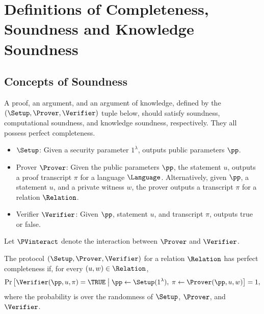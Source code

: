 \section{Definitions of Completeness, Soundness and Knowledge Soundness}
\label{appx:def}

\subsection{Concepts of Soundness}
\label{appx:soundness}
\begin{definition}
\label{def:proofArgumentAoK}
A proof, an argument, and an argument of knowledge,
defined by the $(\Setup, \Prover, \Verifier)$ tuple below,
should satisfy 
soundness,
computational soundness, and 
knowledge soundness,
respectively.
They all possess perfect completeness.
\begin{itemize}
	\item $\Setup$:
	Given a security parameter $1^\lambda$, outputs public parameters $\pp$.
	\item Prover $\Prover$:
	Given the public parameters $\pp$, the statement $u$, outputs a proof transcript $\pi$ for a language $\Language$.
	Alternatively, given $\pp$, a statement $u$, and a private witness $w$, the prover outputs a transcript $\pi$ for a relation $\Relation$.
	\item Verifier $\Verifier$:
	Given $\pp$, statement $u$, and transcript $\pi$, outputs {\sf true} or {\sf false}.
\end{itemize}
Let $\PVinteract$ denote the interaction between $\Prover$ and $\Verifier$.
\end{definition}

\begin{definition}
	\label{def:perfect-completeness}
The protocol $(\Setup,\Prover,\Verifier)$ for a relation \(\Relation\)
has perfect completeness if, for every \((u,w)\in\Relation\),
\[
    \Pr\left[
        \Verifier(\pp,u,\pi)=\TRUE
        \;\middle|\;
        \pp\leftarrow\Setup(1^\lambda),\;
        \pi\leftarrow\Prover(\pp,u,w)
    \right]
    =1,
\]
where the probability is over the randomness of
\(\Setup\), \(\Prover\), and \(\Verifier\).
\end{definition} 

